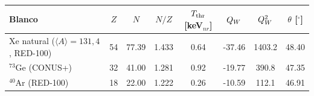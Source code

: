 \begin{tabular}{@{}lccccccc@{}}
\toprule
Blanco & $Z$ & $N$ & $N/Z$ & $T_{\rm thr}$ [keV$_{nr}$] & $Q_{W}$ & $Q_{W}^{2}$ & $\theta$ [$^\circ$] \\
\midrule
Xe natural ($\langle A\rangle{=}131{,}4$, RED-100) & 54 & 77.39 & 1.433 & 0.64 & -37.46 & 1403.2 & 48.40 \\
$^{73}$Ge (CONUS+) & 32 & 41.00 & 1.281 & 0.92 & -19.77 & 390.8 & 47.35 \\
$^{40}$Ar (RED-100) & 18 & 22.00 & 1.222 & 0.26 & -10.59 & 112.1 & 46.91 \\
\bottomrule
\end{tabular}
